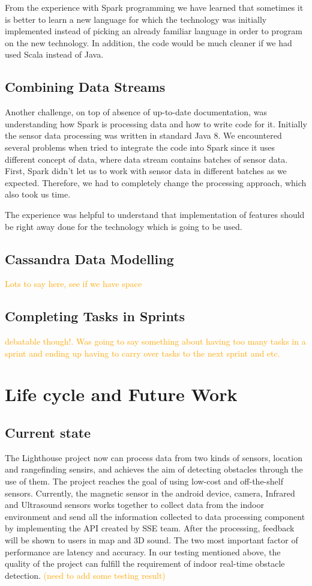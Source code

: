 \documentclass[prodmode,acmtosem]{acmsmall} %
\begin{document}
From the experience with Spark programming we have learned that sometimes it is better to learn a new language for which the technology was initially implemented instead of picking an already familiar language in order to program on the new technology. In addition, the code would be much cleaner if we had used Scala instead of Java.

\subsection{Combining Data Streams}
Another challenge, on top of absence of up-to-date documentation, was understanding how Spark is processing data and how to write code for it. Initially the sensor data processing was written in standard Java 8. We encountered several problems when tried to integrate the code into Spark since it uses different concept of data, where data stream contains batches of sensor data. First, Spark didn't let us to work with sensor data in different batches as we expected. Therefore, we had to completely change the processing approach, which also took us time.

The experience was helpful to understand that implementation of features should be right away done for the technology which is going to be used.

\subsection{Cassandra Data Modelling}
\textcolor{orange}{Lots to say here, see if we have space}

\subsection{Completing Tasks in Sprints}\textcolor{orange}{debatable though!. Was going to say something about having too many tasks in a sprint and ending up having to carry over tasks to the next sprint and etc.}

\section{Life cycle and Future Work}
\subsection{Current state}
The Lighthouse project now can process data from two kinds of sensors, location and rangefinding sensirs, and achieves the aim of detecting obstacles through the use of them. The project reaches the goal of using low-cost and off-the-shelf sensors. Currently, the magnetic sensor in the android device, camera, Infrared and Ultrasound sensors works together to collect data from the indoor environment and send all the information collected to data processing component by implementing the API created by SSE team. After the processing, feedback will be shown to users in map and 3D sound. The two most important factor of performance are latency and accuracy. In our testing mentioned above, the quality of the project can fulfill the requirement of indoor real-time obstacle detection.
\textcolor{orange}{(need to add some testing result)}
\end{document}
